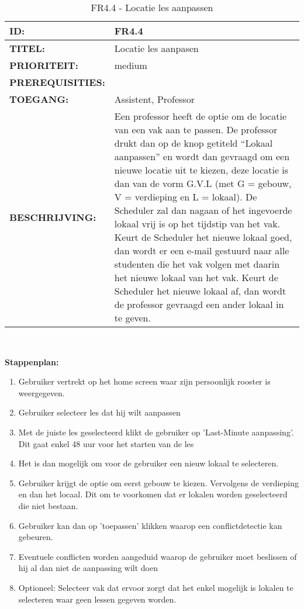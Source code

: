 \noindent\begin{table}[H]
            \begin{tabular}{l | p{10cm}}
                \textbf{ID:} & FR4.4 \\ \hline
                \textbf{TITEL:} & Locatie les aanpasen\\ \hline
                \textbf{PRIORITEIT:} &  medium \\ \hline
                \textbf{PREREQUISITIES:} & \\ \hline
                \textbf{TOEGANG:} & Assistent, Professor \\ \hline
                \textbf{BESCHRIJVING:} & Een professor heeft de optie om de locatie van een vak aan te passen. 
                                        De professor drukt dan op de knop getiteld “Lokaal aanpassen” en wordt dan gevraagd om een nieuwe locatie uit te kiezen, deze locatie is dan van de vorm G.V.L (met G = gebouw, V = verdieping en L = lokaal). De Scheduler zal dan nagaan of het ingevoerde lokaal vrij is op het tijdstip van het vak. Keurt de Scheduler het nieuwe lokaal goed, dan wordt er een e-mail gestuurd naar alle studenten die het vak volgen met daarin het nieuwe lokaal van het vak. Keurt de Scheduler het nieuwe lokaal af, dan wordt de professor gevraagd een ander lokaal in te geven.\\ 
            \end{tabular}\\
            \caption{FR4.4 - Locatie les aanpassen}
            \label{tab:FR4.4 - Locatie les aanpassen}
        \end{table}
        
\textbf{Stappenplan:}
	\begin{enumerate}
	\item Gebruiker vertrekt op het home screen waar zijn persoonlijk rooster is weergegeven.
	\item Gebruiker selecteer les dat hij wilt aanpassen
	\item Met de juiste les geselecteerd klikt de gebruiker op 'Last-Minute aanpassing'. Dit gaat enkel 48 uur voor het starten van de les
	\item Het is dan mogelijk om voor de gebruiker een nieuw lokaal te selecteren.
	\item Gebruiker krijgt de optie om eerst gebouw te kiezen. Vervolgens de verdieping en dan het locaal. Dit om te voorkomen dat er lokalen worden geselecteerd die niet bestaan.
	\item Gebruiker kan dan op 'toepassen' klikken waarop een conflictdetectie kan gebeuren.
	\item Eventuele conflicten worden aangeduid waarop de gebruiker moet beslissen of hij al dan niet de aanpassing wilt doen 
	\item Optioneel: Selecteer vak dat ervoor zorgt dat het enkel mogelijk is lokalen te selecteren waar geen lessen gegeven worden.
	\end{enumerate}	        
        
